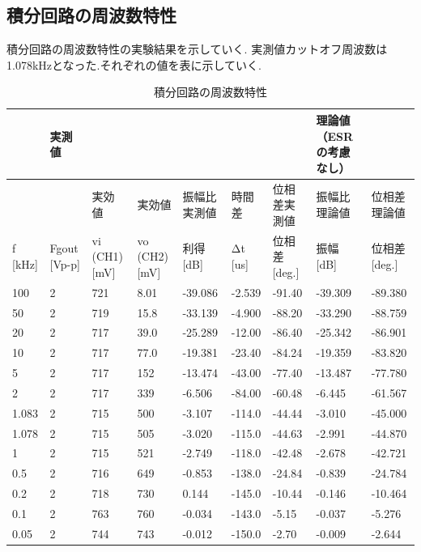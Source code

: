 \documentclass[a4j,10pt,dvipdfmx]{jarticle}
\begin{document}
\subsection{積分回路の周波数特性}
積分回路の周波数特性の実験結果を示していく.
実測値カットオフ周波数は1.078kHzとなった.それぞれの値を表に示していく.
\begin{table}[H]
  \label{res3}
  \begin{center}
    \caption{積分回路の周波数特性}
    \begin{tabularx}{\textwidth}{X|XXXXXX||XX}
      & 実測値 &  &  &  &  &  & 理論値（ESRの考慮なし） &  \\ \hline
      &  & 実効値 & 実効値 & 振幅比実測値 & 時間差 & 位相差実測値 & 振幅比理論値 & 位相差理論値 \\ \hline
     f [kHz] & Fgout [Vp-p] & vi (CH1) [mV] & vo (CH2) [mV] & 利得 [dB] & Δt [us] & 位相差 [deg.] & 振幅 [dB] & 位相差 [deg.] \\ \hline
     100 & 2 & 721  & 8.01  & -39.086  & -2.539  & -91.40  & -39.309  & -89.380  \\
     50 & 2 & 719  & 15.8  & -33.139  & -4.900  & -88.20  & -33.290  & -88.759  \\
     20 & 2 & 717  & 39.0  & -25.289  & -12.00  & -86.40  & -25.342  & -86.901  \\
     10 & 2 & 717  & 77.0  & -19.381  & -23.40  & -84.24  & -19.359  & -83.820  \\
     5 & 2 & 717  & 152  & -13.474  & -43.00  & -77.40  & -13.487  & -77.780  \\
     2 & 2 & 717  & 339  & -6.506  & -84.00  & -60.48  & -6.445  & -61.567  \\
     1.083 & 2 & 715  & 500  & -3.107  & -114.0  & -44.44  & -3.010  & -45.000  \\
     1.078 & 2 & 715  & 505  & -3.020  & -115.0  & -44.63  & -2.991  & -44.870  \\
     1 & 2 & 715  & 521  & -2.749  & -118.0  & -42.48  & -2.678  & -42.721  \\
     0.5 & 2 & 716  & 649  & -0.853  & -138.0  & -24.84  & -0.839  & -24.784  \\
     0.2 & 2 & 718  & 730  & 0.144  & -145.0  & -10.44  & -0.146  & -10.464  \\
     0.1 & 2 & 763  & 760  & -0.034  & -143.0  & -5.15  & -0.037  & -5.276  \\
     0.05 & 2 & 744  & 743  & -0.012  & -150.0  & -2.70  & -0.009  & -2.644  \\
    \end{tabularx}
  \end{center}
  \end{table}
\end{document}
